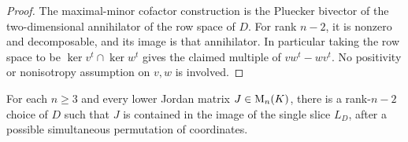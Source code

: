 \begin{proof}
The maximal-minor cofactor construction is the Pluecker bivector
of the two-dimensional annihilator of the row space of $D$.
For rank $n-2$, it is nonzero and decomposable, and its image is
that annihilator. In particular taking the row space to be
$\ker v^t\cap\ker w^t$ gives the claimed multiple of
$vw^t-wv^t$. No positivity or nonisotropy assumption on $v,w$
is involved.
\end{proof}

\begin{proposition}
\label{prop:minJordan}
For each $n\ge3$ and every lower Jordan matrix $J\in\mathrm{M}_n(K)$,
there is a rank-$n-2$ choice of $D$ such that $J$ is contained in
the image of the single slice $L_D$, after a possible simultaneous
permutation of coordinates.
\end{proposition}
